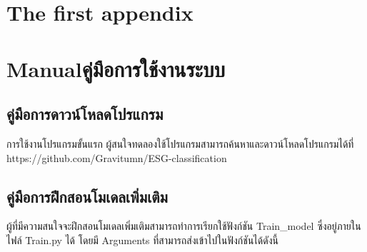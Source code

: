 \chapter{The first appendix}












\chapter{\ifenglish Manual\else คู่มือการใช้งานระบบ\fi}

\section{คู่มือการดาวน์โหลดโปรแกรม}

\enskip \enskip \enskip การใช้งานโปรแกรมขั้นแรก 
ผู้สนใจทดลองใช้โปรแกรมสามารถค้นหาและดาวน์โหลดโปรแกรมได้ที่ 
https://github.com/Gravitumn/ESG-classification 


\section{คู่มือการฝึกสอนโมเดลเพิ่มเติม}

\enskip \enskip \enskip ผู้ที่มีความสนใจจะฝึกสอนโมเดลเพิ่มเติมสามารถทำการเรียกใช้ฟังก์ชัน 
Train\_model ซึ่งอยู่ภายในไฟล์ Train.py ได้ โดยมี Arguments ที่สามารถส่งเข้าไปในฟังก์ชันได้ดังนี้


